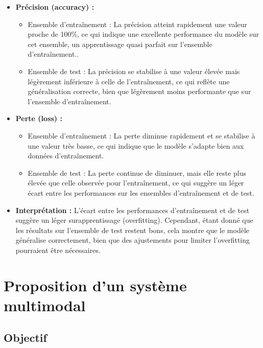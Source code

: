 \documentclass[11pt,a4paper]{article}
\begin{document}
\begin{itemize}
    \item \textbf{Précision (accuracy) :}
    \begin{itemize}
        \item Ensemble d'entraînement : La précision atteint rapidement une valeur proche de 100\%, ce qui indique une excellente performance du modèle sur cet ensemble, un apprentissage quasi parfait sur l'ensemble d'entraînement..
        \item Ensemble de test : La précision se stabilise à une valeur élevée mais légèrement inférieure à celle de l'entraînement, ce qui reflète une généralisation correcte, bien que légèrement moins performante que sur l'ensemble d'entraînement.
    \end{itemize}
    
    \item \textbf{Perte (loss) :}
    \begin{itemize}
        \item Ensemble d'entraînement : La perte diminue rapidement et se stabilise à une valeur très basse, ce qui indique que le modèle s'adapte bien aux données d'entraînement.
        \item Ensemble de test : La perte continue de diminuer, mais elle reste plus élevée que celle observée pour l'entraînement, ce qui suggère un léger écart entre les performances sur les ensembles d'entraînement et de test. 
    \end{itemize}
    
    \item \textbf{Interprétation :} L'écart entre les performances d'entraînement et de test suggère un léger surapprentissage (overfitting). Cependant, étant donné que les résultats sur l'ensemble de test restent bons, cela montre que le modèle généralise correctement, bien que des ajustements pour limiter l'overfitting pourraient être nécessaires.
\end{itemize}

\section{Proposition d'un système multimodal}
\label{sec:multimodal}

\subsection{Objectif}
\label{subsec:objectif_multi}
\end{document}
